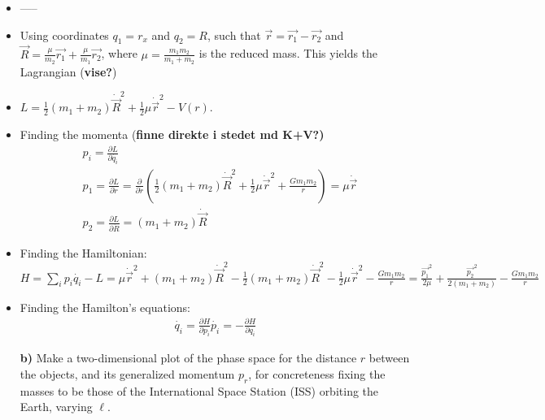 \documentclass[11pt,a4paper]{report}
\newcounter{excount}[chapter]
\newenvironment{exercise}[1][]{\addtocounter{excount}{1} \noindent {\bf Question
    \arabic{excount} \ \ #1}\hspace{2mm}}{\vspace{4mm}}
\begin{document}
\begin{exercise}{\bf Orbital motion\\}
\begin{itemize}
\item -----
\item Using coordinates $q_1=r_x$ and $q_2=R$, such that $\vec{r}=\vec{r_1}-\vec{r_2}$ and $\vec{R}=\frac{\mu}{m_2} \vec{r_1}+\frac{\mu}{m_1}\vec{r_2}$, where $\mu=\frac{m_1m_2}{m_1+m_2}$ is the reduced mass. This yields the Lagrangian (\textbf{vise?})
\item $L=\frac{1}{2}(m_1+m_2)\dot{\vec{R}}^2+\frac{1}{2}\mu\dot{\vec{r}}^2-V(r)$. 
\item Finding the momenta (\textbf{finne direkte i stedet md K+V?)}
\begin{align}
&p_i=\frac{\partial L}{\partial \dot{q_i}}\\
&p_1=\frac{\partial L}{\partial \dot{r}}=\frac{\partial }{\partial \dot{r}}  \left( \frac{1}{2}(m_1+m_2)\dot{\vec{R}}^2+\frac{1}{2}\mu\dot{\vec{r}}^2+\frac{Gm_1m_2}{r}\right)=\mu \dot{\vec{r}} \\
&p_2=\frac{\partial L}{\partial \dot{R}}=(m_1+m_2)\dot{\vec{R}}
\end{align} 
\item Finding the Hamiltonian: $H=\sum_ip_i\dot{q_i}-L=\mu \dot{\vec{r}}^2 +(m_1+m_2)\dot{\vec{R}}^2-\frac{1}{2}(m_1+m_2)\dot{\vec{R}}^2-\frac{1}{2}\mu\dot{\vec{r}}^2-\frac{Gm_1m_2}{r}=\frac{\vec{p_1}^2}{2\mu}+\frac{\vec{p_2}^2}{2(m_1+m_2)}-\frac{Gm_1m_2}{r}$
\item Finding the Hamilton's equations:
\begin{align*}
\dot{q_i}=\frac{\partial H}{\partial p_i}
\dot{p_i}=-\frac{\partial H}{\partial q_i}
\end{align*}

 \item[{\bf b)}] Make a two-dimensional plot of the phase space for the distance $r$ between the objects, and its generalized momentum $p_r$, for concreteness fixing the masses to be those of the International Space Station (ISS) orbiting the Earth, varying $\ell$.


\end{itemize}
\end{exercise}
\end{document}
